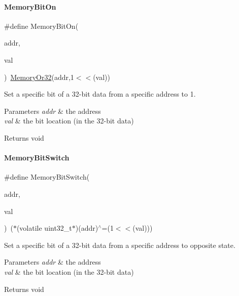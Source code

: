 \paragraph{\texorpdfstring{Memory\+Bit\+On}{MemoryBitOn}}
{\footnotesize\ttfamily \#define Memory\+Bit\+On(\begin{DoxyParamCaption}\item[{}]{addr,  }\item[{}]{val }\end{DoxyParamCaption})~\mbox{\hyperlink{a00020_a27874a97deab7cecdde5ddecf466e31e}{Memory\+Or32}}(addr,1$<$$<$(val))}



Set a specific bit of a 32-\/bit data from a specific address to 1. 


\begin{DoxyParams}{Parameters}
{\em addr} & the address \\
\hline
{\em val} & the bit location (in the 32-\/bit data) \\
\hline
\end{DoxyParams}
\begin{DoxyReturn}{Returns}
void 
\end{DoxyReturn}
\mbox{\label{a00020_ae49e41753dbce64185d380d307ade78d}} 
\paragraph{\texorpdfstring{Memory\+Bit\+Switch}{MemoryBitSwitch}}
{\footnotesize\ttfamily \#define Memory\+Bit\+Switch(\begin{DoxyParamCaption}\item[{}]{addr,  }\item[{}]{val }\end{DoxyParamCaption})~($\ast$(volatile uint32\+\_\+t$\ast$)(addr)$^\wedge$=(1$<$$<$(val)))}



Set a specific bit of a 32-\/bit data from a specific address to opposite state. 


\begin{DoxyParams}{Parameters}
{\em addr} & the address \\
\hline
{\em val} & the bit location (in the 32-\/bit data) \\
\hline
\end{DoxyParams}
\begin{DoxyReturn}{Returns}
void 
\end{DoxyReturn}
\mbox{\label{a00020_a27874a97deab7cecdde5ddecf466e31e}} 
